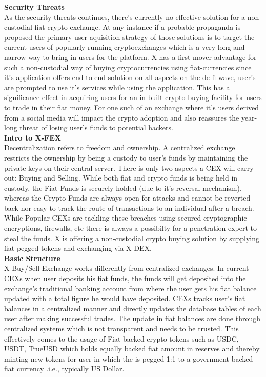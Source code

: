 \documentclass[letterpaper,11pt]{article}
\begin{document}
\textbf{Security Threats}\\

As the security threats continues, there's currently no effective solution for a non-custodial fiat-crypto exchange. At any instance if a probable propaganda is proposed the primary user aquisition strategy of those solutions is to target the current users of popularly running cryptoexchanges which is a very long and narrow way to bring in users for the platform. X has a first mover advantage for such a non-custodial way of buying cryptocurrencies using fiat-currencies since it's application offers end to end solution on all aspects on the de-fi wave, user's are prompted to use it's services while using the application. This has a significance effect in acquiring users for an in-built crypto buying facility for users to trade in their fiat money. For one such of an exchange where it's users derived from a social media will impact the crypto adoption and also reassures the year-long threat of losing user's funds to potential hackers.\\

\textbf{Intro to X-FEX}\\

Decentralization refers to freedom and ownership. A centralized exchange restricts the ownership by being a custody to user's funds by maintaining the private keys on their central server. There is only two aspects a CEX will carry out: Buying and Selling. While both fiat and crypto funds is being held in custody, the Fiat Funds is securely holded (due to it's reversal mechanism), whereas the Crypto Funds are always open for attacks and cannot be reverted back nor easy to track the route of transactions to an individual after a breach. While Popular CEXs are tackling these breaches using secured cryptographic encryptions, firewalls, etc there is always a possibilty for a penetration expert to steal the funds. X is offering a non-custodial crypto buying solution by supplying fiat-pegged-tokens and exchanging via X DEX.\\

\textbf{Basic Structure}\\

X Buy/Sell Exchange works differently from centralized exchanges. In current CEXs when user deposits his fiat funds, the funds will get deposited into the exchange's traditional banking account from where the user gets his fiat balance updated with a total figure he would have deposited. CEXs tracks user's fiat balances in a centralized manner and directly updates the database tables of each user after making successful trades. The update in fiat balances are done through centralized systems which is not transparent and needs to be trusted. This effectively comes to the usage of Fiat-backed-crypto tokens such as USDC, USDT, TrueUSD which holds equally backed fiat amount in reserves and thereby minting new tokens for user in which the is pegged 1:1 to a government backed fiat currency .i.e., typically US Dollar.\\
\end{document}

